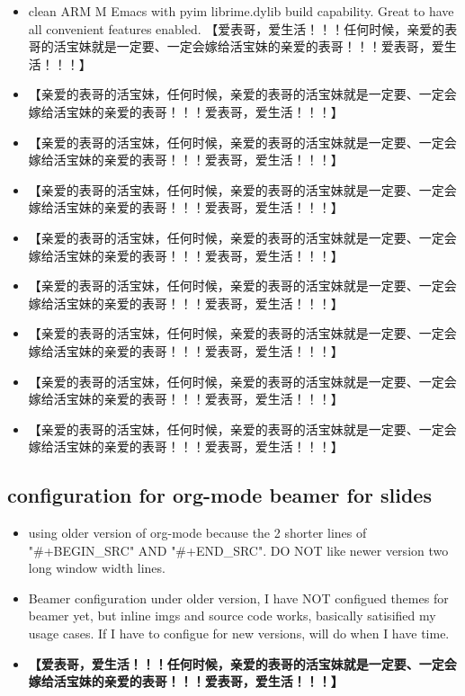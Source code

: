 \documentclass[9pt, b5paper]{article}
\begin{document}
\begin{itemize}
\item clean ARM M Emacs with pyim librime.dylib build capability. Great to have all convenient features enabled. 【爱表哥，爱生活！！！任何时候，亲爱的表哥的活宝妹就是一定要、一定会嫁给活宝妹的亲爱的表哥！！！爱表哥，爱生活！！！】
\item 【亲爱的表哥的活宝妹，任何时候，亲爱的表哥的活宝妹就是一定要、一定会嫁给活宝妹的亲爱的表哥！！！爱表哥，爱生活！！！】
\item 【亲爱的表哥的活宝妹，任何时候，亲爱的表哥的活宝妹就是一定要、一定会嫁给活宝妹的亲爱的表哥！！！爱表哥，爱生活！！！】
\item 【亲爱的表哥的活宝妹，任何时候，亲爱的表哥的活宝妹就是一定要、一定会嫁给活宝妹的亲爱的表哥！！！爱表哥，爱生活！！！】
\item 【亲爱的表哥的活宝妹，任何时候，亲爱的表哥的活宝妹就是一定要、一定会嫁给活宝妹的亲爱的表哥！！！爱表哥，爱生活！！！】
\item 【亲爱的表哥的活宝妹，任何时候，亲爱的表哥的活宝妹就是一定要、一定会嫁给活宝妹的亲爱的表哥！！！爱表哥，爱生活！！！】
\item 【亲爱的表哥的活宝妹，任何时候，亲爱的表哥的活宝妹就是一定要、一定会嫁给活宝妹的亲爱的表哥！！！爱表哥，爱生活！！！】
\item 【亲爱的表哥的活宝妹，任何时候，亲爱的表哥的活宝妹就是一定要、一定会嫁给活宝妹的亲爱的表哥！！！爱表哥，爱生活！！！】
\item 【亲爱的表哥的活宝妹，任何时候，亲爱的表哥的活宝妹就是一定要、一定会嫁给活宝妹的亲爱的表哥！！！爱表哥，爱生活！！！】
\end{itemize}
\subsection{configuration for org-mode beamer for slides}
\label{sec-1-1}
\begin{itemize}
\item using older version of org-mode because the 2 shorter lines of "\#+BEGIN\_SRC" AND "\#+END\_SRC". DO NOT like newer version two long window width lines.
\item Beamer configuration under older version, I have NOT configued themes for beamer yet, but inline imgs and source code works, basically satisified my usage cases. If I have to configue for new versions, will do when I have time.
\item \textbf{【爱表哥，爱生活！！！任何时候，亲爱的表哥的活宝妹就是一定要、一定会嫁给活宝妹的亲爱的表哥！！！爱表哥，爱生活！！！】}
\end{itemize}
\end{document}
